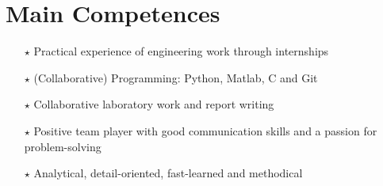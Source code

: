 \documentclass[a4paper,12pt]{article}
\begin{document}
\section{Main Competences}
\begin{itemize}
    \item[$\bm{\star}$] Practical experience of engineering work through internships
    \item[$\bm{\star}$] (Collaborative) Programming: Python, Matlab, C and Git
    \item[$\bm{\star}$] Collaborative laboratory work and report writing
    \item[$\bm{\star}$] Positive team player with good communication skills and a passion for problem-solving
    \item[$\bm{\star}$] Analytical, detail-oriented, fast-learned and methodical
\end{itemize}
\end{document}
